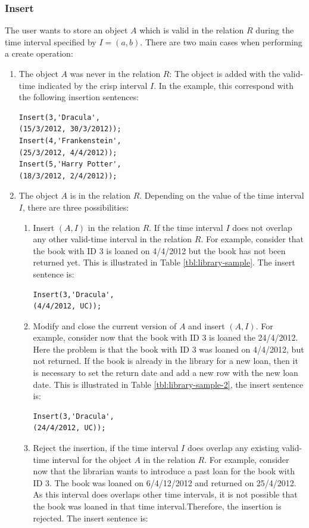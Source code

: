 \subsubsection{\label{subsubsec:insert}Insert}
The user wants to store an object $A$ which is valid in the relation $R$ during the time interval specified by $I = \left(a, b \right)$.
%
%
There are two main cases when performing a create operation:
\begin{enumerate}
\item The object $A$ was never in the relation $R$: The object is added with the valid-time indicated by the crisp interval $I$. In the example, this correspond with the following insertion sentences:
\begin{verbatim}
Insert(3,'Dracula',
(15/3/2012, 30/3/2012));
Insert(4,'Frankenstein',
(25/3/2012, 4/4/2012));
Insert(5,'Harry Potter',
(18/3/2012, 2/4/2012));
\end{verbatim}


\item The object $A$ is in the relation $R$. Depending on the value of the time interval $I$, there are three possibilities:
	\begin{enumerate}
	\item Insert $\left(A, I\right)$ in the relation $R$. If the time interval $I$ does not overlap any other valid-time interval in the relation $R$. For example, consider that the book with ID 3 is loaned on 4/4/2012 but the book has not been returned yet. This is illustrated in Table \ref{tbl:library-sample}. The insert sentence is:
	      \begin{verbatim}
Insert(3,'Dracula',
(4/4/2012, UC));
	      \end{verbatim}


	\item Modify and close the current version of $A$ and insert $\left(A, I\right)$. For example, consider now that the book with ID 3 is loaned  the 24/4/2012. Here the problem is that the book with ID 3 was loaned on 4/4/2012, but not returned. If the book is already in the library for a new loan, then it is necessary to set the return date and add a new row with the new loan date. This is illustrated in Table \ref{tbl:library-sample-2}, the insert sentence is:
	    \begin{verbatim}
Insert(3,'Dracula',
(24/4/2012, UC));
	      \end{verbatim}
	\item Reject the insertion, if the time interval $I$ does overlap any existing valid-time interval for the object $A$ in the relation $R$. For example, consider now that the librarian wants to introduce a past loan for the book with ID 3. The book was loaned on 6/4/12/2012 and returned on 25/4/2012. As this interval does overlaps other time intervals, it is not possible that the book was loaned in that time interval.Therefore, the insertion is rejected. The insert sentence is:


\end{enumerate}
\end{enumerate}

